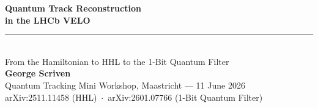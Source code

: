 \documentclass[aspectratio=169,10pt]{beamer}
\begin{document}
{%
\begin{frame}[plain]
  \vspace{0.16\textheight}
  \hspace*{0.04\textwidth}\begin{minipage}{0.9\textwidth}
    {\Huge\bfseries\color{ink} Quantum Track Reconstruction\\[2pt] in the LHCb VELO}\\[12pt]
    {\color{accmin}\rule{0.20\textwidth}{3pt}}\\[12pt]
    {\large\color{ink!75} From the Hamiltonian to HHL to the 1-Bit Quantum Filter}\\[26pt]
    {\color{ink}\textbf{George Scriven}}\\[4pt]
    {\small\color{ink!60} Quantum Tracking Mini Workshop, Maastricht --- 11 June 2026}\\[2pt]
    {\footnotesize\color{ink!50} arXiv:2511.11458 (HHL) \,$\cdot$\, arXiv:2601.07766 (1-Bit Quantum Filter)}
  \end{minipage}
  \vfill
  \hspace*{0.04\textwidth}\logorow{0.044\textheight}
  \vspace{0.03\textheight}
\end{frame}}


\end{document}
